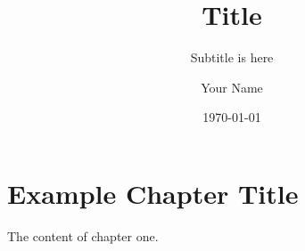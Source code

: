 \documentclass{elegantbook}   %
\title{Title}
\subtitle{Subtitle is here}
\author{Your Name}
\institute{XXX University}
\date{\today}
\begin{document}
\maketitle
\tableofcontents
\mainmatter
\hypersetup{pageanchor=true}

\chapter{Example Chapter Title} %
The content of chapter one.

\end{document}

